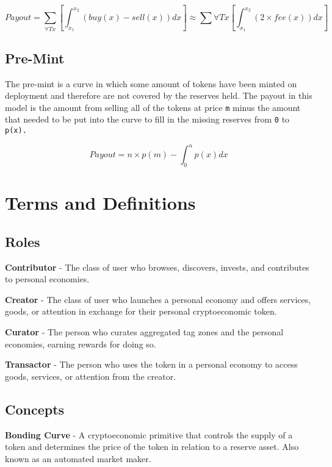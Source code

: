 \documentclass[a4paper, 10pt]{article}
\begin{document}
\begin{appendices}
\[Payout = \sum_{\forall Tx} \left [ \int_{x_{1}}^{x_{2}}(buy(x)-sell(x))dx \right ] \approx \sum{\forall Tx} \left [ \int_{x_{1}}^{x_{2}}(2 \times fee(x))dx \right ]\]

\subsection{Pre-Mint}

The pre-mint is a curve in which some amount of tokens have been minted on deployment and therefore are not covered by the reserves held. The payout in this model is the amount from selling all of the tokens at price \texttt{m} minus the amount that needed to be put into the curve to fill in the missing reserves from \texttt{0} to \texttt{p(x).}

\[Payout = n \times p(m) - \int_{0}^{n} p(x) dx\]

\section{Terms and Definitions}

\subsection{Roles}

\textbf{Contributor} - The class of user who browses, discovers, invests, and contributes to personal economies. 
\medskip

\noindent
\textbf{Creator} - The class of user who launches a personal economy and offers services, goods, or attention in exchange for their personal cryptoeconomic token.
\medskip

\noindent
\textbf{Curator} - The person who curates aggregated tag zones and the personal economies, earning rewards for doing so.
\medskip

\noindent
\textbf{Transactor} - The person who uses the token in a personal economy to access goods, services, or attention from the creator. 

\subsection{Concepts}

\textbf{Bonding Curve} - A cryptoeconomic primitive that controls the supply of a token and determines the price of the token in relation to a reserve asset. Also known as an automated market maker. 
\medskip



\end{appendices}
\end{document}
